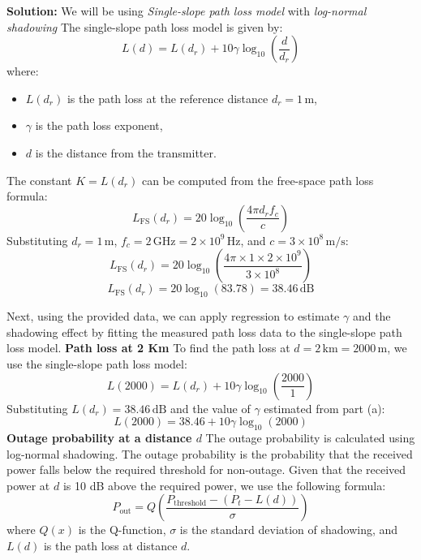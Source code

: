 \documentclass[a4paper,12pt]{book}
\begin{document}
	\textbf{Solution:} We will be using \textit{Single-slope path loss model} with \textit{log-normal shadowing}
	\newline\newline\noindent
	The single-slope path loss model is given by:
	\[
	L(d) = L(d_r) + 10 \gamma \log_{10} \left( \frac{d}{d_r} \right)
	\]
	where:
	\begin{itemize}
		\item \( L(d_r) \) is the path loss at the reference distance \( d_r = 1 \, \text{m} \),
		\item \( \gamma \) is the path loss exponent,
		\item \( d \) is the distance from the transmitter.
	\end{itemize}
	
	The constant \( K = L(d_r) \) can be computed from the free-space path loss formula:
	\[
	L_{\text{FS}}(d_r) = 20 \log_{10} \left( \frac{4\pi d_r f_c}{c} \right)
	\]
	Substituting \( d_r = 1 \, \text{m} \), \( f_c = 2 \, \text{GHz} = 2 \times 10^9 \, \text{Hz} \), and \( c = 3 \times 10^8 \, \text{m/s} \):
	\[
	L_{\text{FS}}(d_r) = 20 \log_{10} \left( \frac{4 \pi \times 1 \times 2 \times 10^9}{3 \times 10^8} \right)
	\]
	\[
	L_{\text{FS}}(d_r) = 20 \log_{10}(83.78) = 38.46 \, \text{dB}
	\]
	
	Next, using the provided data, we can apply regression to estimate \( \gamma \) and the shadowing effect by fitting the measured path loss data to the single-slope path loss model.
	\newline\newline\noindent
	\textbf{Path loss at 2 Km}
	\newline
	To find the path loss at \( d = 2 \, \text{km} = 2000 \, \text{m} \), we use the single-slope path loss model:
	\[
	L(2000) = L(d_r) + 10 \gamma \log_{10} \left( \frac{2000}{1} \right)
	\]
	Substituting \( L(d_r) = 38.46 \, \text{dB} \) and the value of \( \gamma \) estimated from part (a):
	\[
	L(2000) = 38.46 + 10 \gamma \log_{10}(2000)
	\]
	\noindent
	\textbf{Outage probability at a distance \( d \)}
	\newline
	The outage probability is calculated using log-normal shadowing. The outage probability is the probability that the received power falls below the required threshold for non-outage. Given that the received power at \( d \) is 10 dB above the required power, we use the following formula:
	\[
	P_{\text{out}} = Q \left( \frac{P_{\text{threshold}} - (P_t - L(d))}{\sigma} \right)
	\]
	where \( Q(x) \) is the Q-function, \( \sigma \) is the standard deviation of shadowing, and \( L(d) \) is the path loss at distance \( d \).
	
\end{document}
